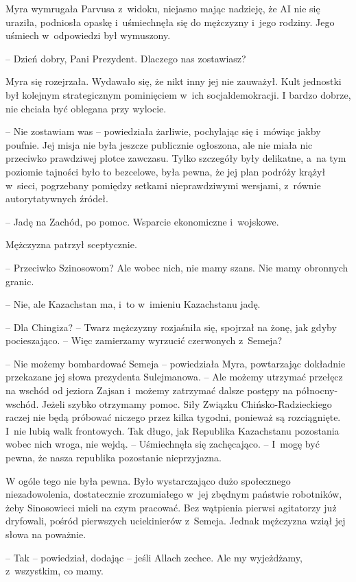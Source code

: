\documentclass[oneside,polish,11pt,sfheadings]{mwbk}
\begin{document}
Myra wymrugała Parvusa z~widoku, niejasno mając nadzieję, że AI nie się
uraziła, podniosła opaskę i~uśmiechnęła się do mężczyzny i~jego rodziny.
Jego uśmiech w~odpowiedzi był wymuszony.

-- Dzień dobry, Pani Prezydent. Dlaczego nas zostawiasz?

Myra się rozejrzała. Wydawało się, że nikt inny jej nie zauważył. Kult
jednostki był kolejnym strategicznym pominięciem w~ich socjaldemokracji.
I bardzo dobrze, nie chciała być oblegana przy wylocie. 

-- Nie zostawiam was -- powiedziała żarliwie, pochylając się i~mówiąc jakby poufnie. Jej misja nie była jeszcze publicznie ogłoszona, ale nie miała nic przeciwko
prawdziwej plotce zawczasu. Tylko szczegóły były delikatne, a~na tym
poziomie tajności było to bezcelowe, była pewna, że jej plan podróży
krążył w~sieci, pogrzebany pomiędzy setkami nieprawdziwymi wersjami, z~równie autorytatywnych źródeł. 

-- Jadę na Zachód, po pomoc. Wsparcie ekonomiczne i~wojskowe.

Mężczyzna patrzył sceptycznie. 

-- Przeciwko Szinosowom? Ale wobec nich,
nie mamy szans. Nie mamy obronnych granic.

-- Nie, ale Kazachstan ma, i~to w~imieniu Kazachstanu jadę.

-- Dla Chingiza? -- Twarz mężczyzny rozjaśniła się, spojrzał na żonę, jak
gdyby pocieszająco. -- Więc zamierzamy wyrzucić czerwonych z~Semeja?

-- Nie możemy bombardować Semeja -- powiedziała Myra, powtarzając
dokładnie przekazane jej słowa prezydenta Sulejmanowa. -- Ale możemy
utrzymać przełęcz na wschód od jeziora Zajsan i~możemy zatrzymać dalsze
postępy na północny-wschód. Jeżeli szybko otrzymamy pomoc. Siły Związku
Chińsko-Radzieckiego raczej nie będą próbować niczego przez kilka
tygodni, ponieważ są rozciągnięte. I~nie lubią walk frontowych. Tak
długo, jak Republika Kazachstanu pozostania wobec nich wroga, nie wejdą.
-- Uśmiechnęła się zachęcająco. -- I~mogę być pewna, że nasza republika
pozostanie nieprzyjazna.

W ogóle tego nie była pewna. Było wystarczająco dużo społecznego
niezadowolenia, dostatecznie zrozumiałego w~jej zbędnym państwie
robotników, żeby Sinosowieci mieli na czym pracować. Bez wątpienia
pierwsi agitatorzy już dryfowali, pośród pierwszych uciekinierów z~Semeja. Jednak mężczyzna wziął jej słowa na poważnie.

-- Tak -- powiedział, dodając -- jeśli Allach zechce. Ale my wyjeżdżamy, z~wszystkim, co mamy.
\end{document}
